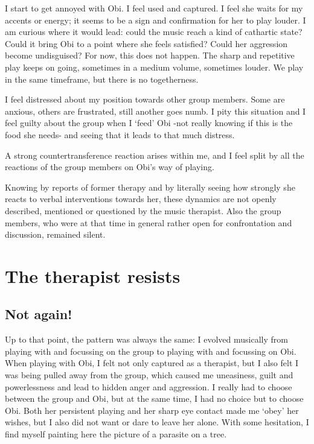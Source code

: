 \documentclass[authordate, empirical, issue]{jote-new-article}
\begin{document}
I start to get annoyed with Obi. I feel used and captured. I feel she waits for my accents or energy; it seems to be a sign and confirmation for her to play louder. I am curious where it would lead: could the music reach a kind of cathartic state? Could it bring Obi to a point where she feels satisfied? Could her aggression become undisguised? For now, this does not happen. The sharp and repetitive play keeps on going, sometimes in a medium volume, sometimes louder. We play in the same timeframe, but there is no togetherness.



I feel distressed about my position towards other group members. Some are anxious, others are frustrated, still another goes numb. I pity this situation and I feel guilty about the group when I ‘feed' Obi -not really knowing if this is the food she needs- and seeing that it leads to that much distress.



A strong countertransference reaction arises within me, and I feel split by all the reactions of the group members on Obi's way of playing.



Knowing by reports of former therapy and by literally seeing how strongly she reacts to verbal interventions towards her, these dynamics are not openly described, mentioned or questioned by the music therapist. Also the group members, who were at that time in general rather open for confrontation and discussion, remained silent.


\section{The therapist resists}



\subsection{Not again!}



Up to that point, the pattern was always the same: I evolved musically from playing with and focussing on the group to playing with and focussing on Obi. When playing with Obi, I felt not only captured as a therapist, but I also felt I was being pulled away from the group, which caused me uneasiness, guilt and powerlessness and lead to hidden anger and aggression. I really had to choose between the group and Obi, but at the same time, I had no choice but to choose Obi. Both her persistent playing and her sharp eye contact made me ‘obey' her wishes, but I also did not want or dare to leave her alone. With some hesitation, I find myself painting here the picture of a parasite on a tree.
\end{document}
